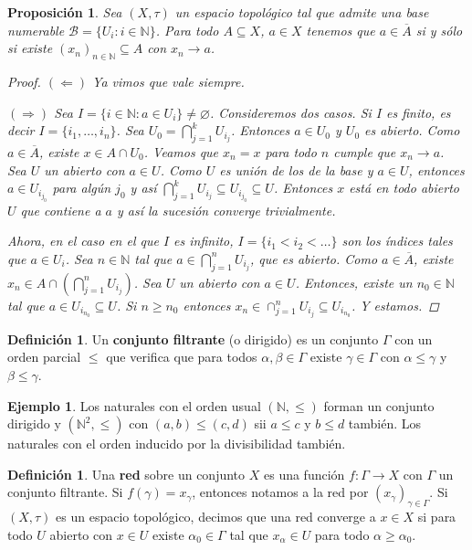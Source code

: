 \documentclass[12pt]{book}
\newtheorem{prop}[teo]{Proposición}
\theoremstyle{definition}
\newtheorem{defn}[teo]{Definición}
\newtheorem{ex}[teo]{Ejemplo}
\newcommand{\NN}{\mathbb{N}}
\let\emptyset\varnothing
\begin{document}
\begin{prop}
Sea $(X,\tau)$ un espacio topológico tal que admite una base numerable $\mathscr{B} = \{U_i : i\in\NN\}$. Para todo $A\subseteq X$, $a\in X$ tenemos que $a\in\overline{A}$ si y sólo si existe $(x_n)_{n\in\NN}\subseteq A$ con $x_n\longrightarrow a$.
\begin{proof}
$(\Longleftarrow)$ Ya vimos que vale siempre.

$(\Longrightarrow)$ Sea $I=\{i\in\NN : a\in U_i\}\neq\emptyset$. Consideremos dos casos. Si $I$ es finito, es decir $I=\{i_1,\ldots , i_n\}$. Sea $U_0 = \displaystyle\bigcap_{j=1}^k U_{i_j}$. Entonces $a\in U_0$ y $U_0$ es abierto. Como $a\in\overline{A}$, existe $x\in A\cap U_0$. Veamos que $x_n=x$ para todo $n$ cumple que $x_n\longrightarrow a$. Sea $U$ un abierto con $a\in U$. Como $U$ es unión de los de la base y $a\in U$, entonces $a\in U_{i_{j_0}}$ para algún $j_0$ y así $\displaystyle\bigcap_{j=1}^k U_{i_j}\subseteq U_{i_{j_0}}\subseteq U$. Entonces $x$ está en todo abierto $U$ que contiene a $a$ y así la sucesión converge trivialmente.

Ahora, en el caso en el que $I$ es infinito, $I=\{i_1<i_2<\ldots\}$ son los índices tales que $a\in U_i$. Sea $n\in\NN$ tal que $a\in \displaystyle\bigcap_{j=1}^n U_{i_j}$, que es abierto. Como $a\in\overline{A}$, existe $x_n\in A\cap \left(\displaystyle\bigcap_{j=1}^n U_{i_j}\right)$. Sea $U$ un abierto con $a\in U$. Entonces, existe un $n_0\in\NN$ tal que $a\in U_{i_{n_0}}\subseteq U$. Si $n\geq n_0$ entonces $x_n\in\displaystyle\cap_{j=1}^n U_{i_j}\subseteq U_{i_{n_0}}$. Y estamos.

\end{proof} 
\end{prop}

\begin{defn}
Un \textbf{conjunto filtrante} (o dirigido) es un conjunto $\Gamma$ con un orden parcial $\leq$ que verifica que para todos $\alpha,\beta\in\Gamma$ existe $\gamma\in\Gamma$ con $\alpha\leq \gamma$ y $\beta\leq\gamma$.
\end{defn}

\begin{ex}
Los naturales con el orden usual $(\NN,\leq)$ forman un conjunto dirigido y $(\NN^2 , \leq)$ con $(a,b)\leq (c,d)$ sii $a\leq c$ y $b\leq d$ también. Los naturales con el orden inducido por la divisibilidad también.
\end{ex}

\begin{defn}
Una \textbf{red} sobre un conjunto $X$ es una función $f:\Gamma\to X$ con $\Gamma$ un conjunto filtrante. Si $f(\gamma)=x_\gamma$, entonces notamos a la red por $(x_\gamma)_{\gamma\in\Gamma}$. Si $(X,\tau)$ es un espacio topológico, decimos que una red converge a $x\in X$ si para todo $U$ abierto con $x\in U$ existe $\alpha_0\in\Gamma$ tal que $x_\alpha \in U$ para todo $\alpha\geq \alpha_0$.
\end{defn}
\end{document}
